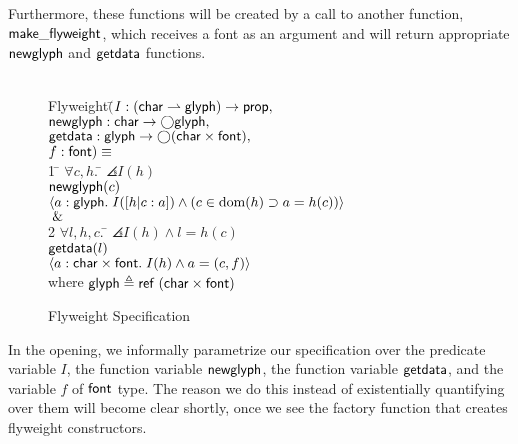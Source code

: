 Furthermore, these functions will be created by a call to another
function, $\mathsf{make\_flyweight}$, which receives a font as an
argument and will return appropriate $\mathsf{newglyph}$ and
$\mathsf{getdata}$ functions.

\begin{figure}
\begin{tabbing}
\\
Flyweight$($\=$I : (\mathsf{char} \rightharpoonup \mathsf{glyph}) \to \mathsf{prop},\;\; $\\
\> $\mathsf{newglyph} : \mathsf{char} \to \bigcirc{\mathsf{glyph}},$ \\
\> $\mathsf{getdata} : \mathsf{glyph} \to \bigcirc{(\mathsf{char}\times \mathsf{font})},$ \\
\> $f:\mathsf{font}) \equiv$ \\

1 \qquad\=  $\forall$\=$c, h.\;$\=
         $\angles{I(h)}$ \\
  \>\>\>${\mathsf{newglyph}(c)}$ \\
  \>\>\>$\left<{a:\mathsf{glyph}.\; I([h|c:a]) \land (c \in \mbox{dom}({h}) \supset a = h(c))}\right>$ \\
  \> \!$\;\&\;$ \\
2 \> $\forall l, h, c.\;$\=
     $\angles{I(h) \land l = h(c)}$ \\
\>\> ${\mathsf{getdata}(l)}$ \\
\>\> $\left<{a:\mathsf{char} \times \mathsf{font}.\;  I(h) \land a = (c,f)}\right>$ \\[1em]

where $\mathsf{glyph} \triangleq \mathsf{ref}\;(\mathsf{char} \times \mathsf{font})$

% 
\end{tabbing}
\caption{Flyweight Specification}
\label{flyweight-spec}
\end{figure}

In the opening, we informally parametrize our specification over the
predicate variable $I$, the function variable $\mathsf{newglyph}$, the
function variable $\mathsf{getdata}$, and the variable $f$ of $\mathsf{font}$
type. The reason we do this instead of existentially quantifying over
them will become clear shortly, once we see the factory function that
creates flyweight constructors.

